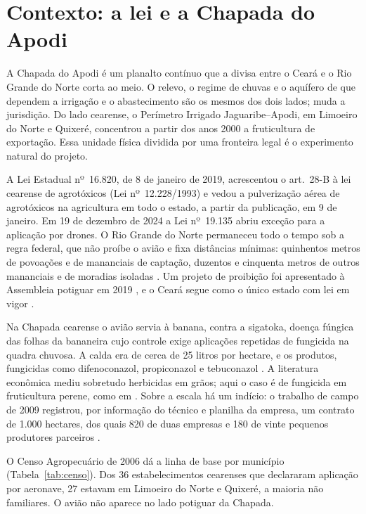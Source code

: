 \chapter{Contexto: a lei e a Chapada do Apodi}
\label{sec:politica}

A Chapada do Apodi é um planalto contínuo que a divisa entre o Ceará e o Rio
Grande do Norte corta ao meio. O relevo, o regime de chuvas e o aquífero de
que dependem a irrigação e o abastecimento são os mesmos dos dois lados; muda a jurisdição. Do lado cearense, o Perímetro Irrigado
Jaguaribe--Apodi, em Limoeiro do Norte e Quixeré, concentrou a partir dos anos
2000 a fruticultura de exportação. Essa unidade física dividida por uma fronteira legal
é o experimento natural do projeto.

A Lei Estadual nº~16.820, de 8 de janeiro de 2019, acrescentou o art.~28-B à
lei cearense de agrotóxicos (Lei nº~12.228/1993) e vedou a pulverização aérea
de agrotóxicos na agricultura em todo o estado, a partir da publicação, em 9 de
janeiro. Em 19 de dezembro de 2024 a Lei nº~19.135 abriu exceção para a
aplicação por drones. O Rio
Grande do Norte permaneceu todo o tempo sob a regra federal, que não proíbe o
avião e fixa distâncias mínimas: quinhentos metros de povoações e de
mananciais de captação, duzentos e cinquenta metros de outros mananciais e de
moradias isoladas \cite{mapa2008in2}. Um projeto de proibição foi apresentado
à Assembleia potiguar em 2019 \cite{alrn2019pl}, e o Ceará segue como o único
estado com lei em vigor \cite{olivete2025}.

Na Chapada cearense o avião servia à banana, contra a sigatoka, doença fúngica
das folhas da bananeira cujo controle exige aplicações repetidas de fungicida
na quadra chuvosa. A calda era de cerca de 25 litros por hectare, e os
produtos, fungicidas como difenoconazol, propiconazol e tebuconazol
\cite[p.~526]{teixeira2011rebulico}. A literatura econômica mediu sobretudo
herbicidas em grãos; aqui o caso é de fungicida em fruticultura perene, como
em . Sobre a escala há um indício: o trabalho de campo de 2009
registrou, por informação do técnico e planilha da empresa, um contrato de 1.000 hectares, dos quais 820 de duas
empresas e 180 de vinte pequenos produtores parceiros
\cite[p.~171]{marinho2011dimensao}.

O Censo Agropecuário de 2006 dá a linha de base por município
(Tabela~\ref{tab:censo}). Dos 36 estabelecimentos cearenses que declararam
aplicação por aeronave, 27 estavam em Limoeiro do Norte e Quixeré, a maioria
não familiares. O avião não aparece no lado potiguar da Chapada.

